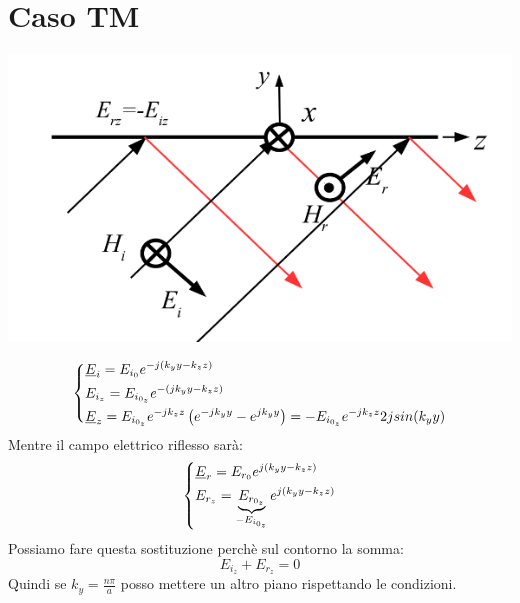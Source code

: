 \section{Caso TM} 
\begin{center}
   \includegraphics[width=.8\textwidth]{Images/figure46.png}
\end{center}
\begin{equation*}
    \begin{dcases}
    \underline{E}_i = E_{i_0} e^{-j(k_y y - k_z z)}\\
    E_{i_z} = E_{i_{0_z}} e^{-(jk_y y - k_z z)}\\
    \underline{E}_z = E_{i_{0_z}} e^{-j k_z z} \left(e^{-j k_y y} - e^{jk_y y}\right) = - E_{i_{0_z}} e^{-j k_z z}  2 j sin(k_y y)
    \end{dcases}
\end{equation*}
Mentre il campo elettrico riflesso sarà:
\begin{equation*}
\begin{dcases}
    \underline{E}_r = E_{r_0} e^{j(k_y y - k_z z)}\\
    E_{r_z} = \underbrace{E_{r_{0_z}}}_{-E_{i_{0_z}}} e^{j(k_y y - k_z z)}
\end{dcases}
\end{equation*}
Possiamo fare questa sostituzione perchè sul contorno la somma:
\begin{equation*}
    E_{i_z} + E_{r_z} = 0
\end{equation*}
Quindi se $k_y = \frac{n\pi}{a}$ posso mettere un altro piano rispettando le condizioni.

